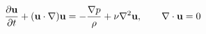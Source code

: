 \documentclass[preview]{standalone}
\begin{document}
\begin{align*}
\special{dvisvgm:raw <g id='unique000'>}\pdv{\va u}{t}+(\va u\cdot\nabla)\va u=-\frac{\nabla p}{\rho}+\nu\nabla^2\va u,\qquad\nabla\cdot\va u=0\special{dvisvgm:raw </g>}
\end{align*}
\end{document}
